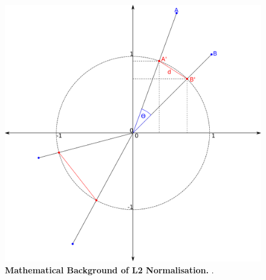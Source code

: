 \begin{figure}[!hbt]
    \centering
    \includegraphics[width=\dimexpr\textwidth-2\fboxsep-2\fboxrule,fbox]{Graphics/L2_Euclidean.pdf}
    \caption[Mathematical Background of L2 Normalisation]{\textbf{Mathematical Background of L2 Normalisation.} .}
    \label{fig:L2_Normalisation_Background}
\end{figure}

\blindtext


